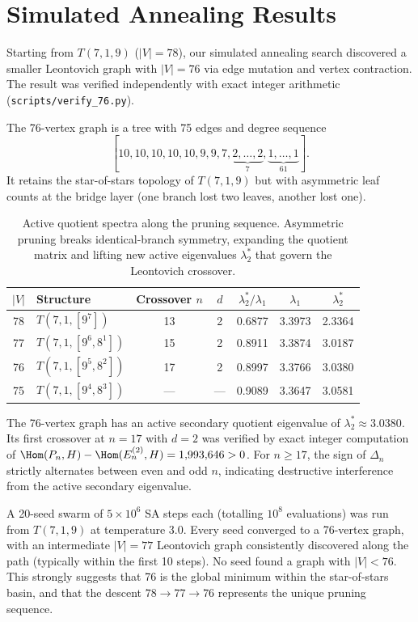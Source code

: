 \section{Simulated Annealing Results}
\label{app:sa}

Starting from $T(7,1,9)$ ($|V|=78$), our simulated annealing
search discovered a smaller Leontovich graph with $|V|=76$ via
edge mutation and vertex contraction.  The result was verified
independently with exact integer arithmetic
(\texttt{scripts/verify\_76.py}).

The 76-vertex graph is a tree with 75 edges and degree sequence
\[
  [10, 10, 10, 10, 10, 9, 9, 7, \underbrace{2, \ldots, 2}_{7},
   \underbrace{1, \ldots, 1}_{61}].
\]
It retains the star-of-stars topology of $T(7,1,9)$ but with
asymmetric leaf counts at the bridge layer (one branch lost two
leaves, another lost one).

\begin{table}[H]
\centering
\caption{Active quotient spectra along the pruning sequence. Asymmetric pruning breaks identical-branch symmetry, expanding the quotient matrix and lifting new active eigenvalues $\lambda_2^*$ that govern the Leontovich crossover.}
\label{tab:sa_hits}
\begin{tabular}{@{}clccccc@{}}
  \toprule
  $|V|$ & Structure & Crossover $n$ & $d$ & $\lambda_2^*/\lambda_1$ & $\lambda_1$ & $\lambda_2^*$ \\
  \midrule
  78 & $T(7,1,[9^7])$     & 13  & 2 & 0.6877 & 3.3973 & 2.3364 \\
  77 & $T(7,1,[9^6,8^1])$ & 15  & 2 & 0.8911 & 3.3874 & 3.0187 \\
  76 & $T(7,1,[9^5,8^2])$ & 17  & 2 & 0.8997 & 3.3766 & 3.0380 \\
  \midrule
  75 & $T(7,1,[9^4,8^3])$ & --- & --- & 0.9089 & 3.3647 & 3.0581 \\
  \bottomrule
\end{tabular}
\end{table}

\noindent
The 76-vertex graph has an active secondary quotient eigenvalue of $\lambda_2^* \approx 3.0380$. Its first crossover
at $n = 17$ with $d = 2$ was verified by exact integer computation
of $\Hom(P_n, H) - \Hom(E_n^{(2)}, H) = 1{,}993{,}646 > 0$.
For $n \ge 17$, the sign of $\Delta_n$ strictly alternates between
even and odd $n$, indicating destructive interference from the
active secondary eigenvalue.

A 20-seed swarm of $5 \times 10^6$ SA steps each (totalling
$10^8$ evaluations) was run from $T(7,1,9)$ at temperature 3.0.
Every seed converged to a 76-vertex graph, with an intermediate
$|V|=77$ Leontovich graph consistently discovered along the path
(typically within the first 10 steps). No seed found a graph with
$|V| < 76$.  This strongly suggests that 76 is the global minimum
within the star-of-stars basin, and that the descent
$78 \to 77 \to 76$ represents the unique pruning sequence.

